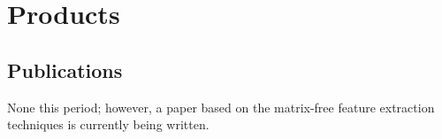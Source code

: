 \section{Products}

\subsection{Publications}
None this period; however, a paper based on the matrix-free feature extraction techniques is currently being written.

